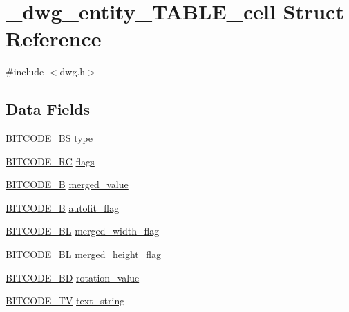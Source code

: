 \hypertarget{struct__dwg__entity__TABLE__cell}{\section{\-\_\-dwg\-\_\-entity\-\_\-\-T\-A\-B\-L\-E\-\_\-cell \-Struct \-Reference}
\label{struct__dwg__entity__TABLE__cell}
}


{\ttfamily \#include $<$dwg.\-h$>$}

\subsection*{\-Data \-Fields}
\begin{DoxyCompactItemize}
\item 
\hyperlink{dwg_8h_a94297606fbd4a4ff97e8add284af0809}{\-B\-I\-T\-C\-O\-D\-E\-\_\-\-B\-S} \hyperlink{struct__dwg__entity__TABLE__cell_a18a4bff8c525bf86d09d2fa12ff13d61}{type}
\item 
\hyperlink{dwg_8h_a7fd199a8f9c9cc52bdab220f65a2a619}{\-B\-I\-T\-C\-O\-D\-E\-\_\-\-R\-C} \hyperlink{struct__dwg__entity__TABLE__cell_a4e7ead47d4c7b4478b9478b7d8a05f45}{flags}
\item 
\hyperlink{dwg_8h_ab533b1f62d9086749e3bb5b67e9f224e}{\-B\-I\-T\-C\-O\-D\-E\-\_\-\-B} \hyperlink{struct__dwg__entity__TABLE__cell_adcb358278e559bb569197f0c7fa99c36}{merged\-\_\-value}
\item 
\hyperlink{dwg_8h_ab533b1f62d9086749e3bb5b67e9f224e}{\-B\-I\-T\-C\-O\-D\-E\-\_\-\-B} \hyperlink{struct__dwg__entity__TABLE__cell_aad7e7835a45c7eb7b803087279c5c873}{autofit\-\_\-flag}
\item 
\hyperlink{dwg_8h_aebd5f127038868cbabc3d55d91da776c}{\-B\-I\-T\-C\-O\-D\-E\-\_\-\-B\-L} \hyperlink{struct__dwg__entity__TABLE__cell_acf42f114939503b90963dace7f9c79b3}{merged\-\_\-width\-\_\-flag}
\item 
\hyperlink{dwg_8h_aebd5f127038868cbabc3d55d91da776c}{\-B\-I\-T\-C\-O\-D\-E\-\_\-\-B\-L} \hyperlink{struct__dwg__entity__TABLE__cell_adde75a0340c5755e8479555e5a502be8}{merged\-\_\-height\-\_\-flag}
\item 
\hyperlink{dwg_8h_a3c1e6781466b74ba07785d57da70ed97}{\-B\-I\-T\-C\-O\-D\-E\-\_\-\-B\-D} \hyperlink{struct__dwg__entity__TABLE__cell_a7e0471e2d66a5b064ad792a24c6e5db7}{rotation\-\_\-value}
\item 
\hyperlink{dwg_8h_a2a7e040c6e36ca039b03608679ecaf7c}{\-B\-I\-T\-C\-O\-D\-E\-\_\-\-T\-V} \hyperlink{struct__dwg__entity__TABLE__cell_a639d45b5578e5a1ee66420f1991942ff}{text\-\_\-string}

\end{DoxyCompactItemize}
